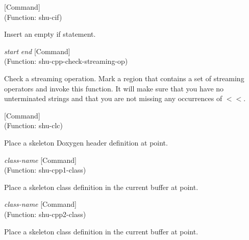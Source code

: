 \vspace{1em}
\noindent
{}
\usebox{\funcname}
 \hfill [Command]\\%
 (Function: shu-cif)

\begin{doc-string}
Insert an empty if statement.
\end{doc-string}

\vspace{1em}
\noindent
{}
\usebox{\funcname}\emph{start} \emph{end}
 \hfill [Command]\\%
 (Function: shu-cpp-check-streaming-op)

\begin{doc-string}
Check a streaming operation.   Mark a region that contains a set of streaming
operators and invoke this function.  It will make sure that you have no unterminated
strings and that you are not missing any occurrences of $<$$<$.
\end{doc-string}

\vspace{1em}
\noindent
{}
\usebox{\funcname}
 \hfill [Command]\\%
 (Function: shu-clc)

\begin{doc-string}
Place a skeleton Doxygen header definition at point.
\end{doc-string}

\vspace{1em}
\noindent
{}
\usebox{\funcname}\emph{class-name}
 \hfill [Command]\\%
 (Function: shu-cpp1-class)

\begin{doc-string}
Place a skeleton class definition in the current buffer at point.
\end{doc-string}

\vspace{1em}
\noindent
{}
\usebox{\funcname}\emph{class-name}
 \hfill [Command]\\%
 (Function: shu-cpp2-class)

\begin{doc-string}
Place a skeleton class definition in the current buffer at point.
\end{doc-string}


